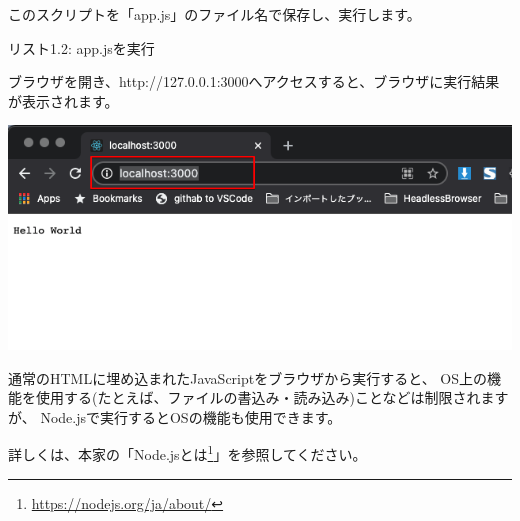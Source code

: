 このスクリプトを「app.js」のファイル名で保存し、実行します。

\def\startercodeblockfontsize{}
\begin{starterterminal}[_105919107]{リスト1.2: app.jsを実行}\end{starterterminal}

ブラウザを開き、http://127.0.0.1:3000へアクセスすると、ブラウザに実行結果が表示されます。

\begin{reviewimage}%
\includegraphics[width=1.0\maxwidth]{./images/01-createDevEnv/01_00browser_helloWorld.png}%
\label{image:01-createDevEnv:01_00browser_helloWorld}
\end{reviewimage}

\clearpage


通常のHTMLに埋め込まれたJavaScriptをブラウザから実行すると、
OS上の機能を使用する(たとえば、ファイルの書込み・読み込み)ことなどは制限されますが、
Node.jsで実行するとOSの機能も使用できます。

\begin{starternote}[]{}

詳しくは、本家の「Node.jsとは\footnote{\url{https://nodejs.org/ja/about/}}」を参照してください。

\end{starternote}

\clearpage


